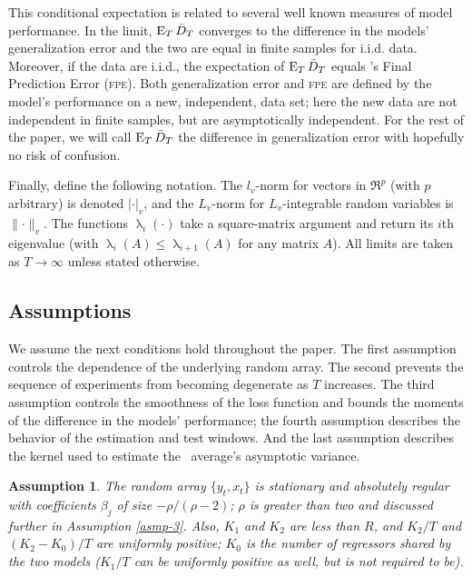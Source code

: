 \documentclass[11pt]{article}
\DeclareMathOperator{\eigen}{\lambda}
\newtheorem{asmp}{Assumption}
\newcommand{\citepos}[1]{\citeauthor{#1}'s \citeyearpar{#1}}
\begin{document}
This conditional expectation is related to several well known measures
of model performance.  In the limit, $\operatorname{E}_{T} \bar{D}_{T}$ converges to
the difference in the models' generalization error and the two are
equal in finite samples for i.i.d. data.  Moreover, if the data are
i.i.d., the expectation of $\operatorname{E}_T \bar{D}_{T}$ equals \citepos{Aka:69} Final
Prediction Error (\textsc{fpe}).  Both generalization error and
\textsc{fpe} are defined by the model's performance on a new,
independent, data set; here the new data are not independent in finite
samples, but are asymptotically independent.  For the rest of the
paper, we will call $\operatorname{E}_T \bar{D}_{T}$ the difference in generalization
error with hopefully no risk of confusion.

Finally, define the following notation.  The $l_v$-norm for vectors in
$\Re^p$ (with $p$ arbitrary) is denoted $\lvert \cdot \rvert_v$, and
the $L_v$-norm for $L_v$-integrable random variables is $\lVert \cdot
\rVert_v$.  The functions $\eigen_i(\cdot)$ take a square-matrix
argument and return its $i$th eigenvalue (with $\eigen_{i}(A) \leq
\eigen_{i+1}(A)$ for any matrix $A$).  All limits are taken as $T \to
\infty$ unless stated otherwise.
 
\subsection{Assumptions}

We assume the next conditions hold throughout the paper.  The first
assumption controls the dependence of the underlying random array.
The second prevents the sequence of experiments from becoming
degenerate as $T$ increases.  The third assumption controls the
smoothness of the loss function and bounds the moments of the
difference in the models' performance; the fourth assumption describes
the behavior of the estimation and test windows.  And the last
assumption describes the kernel used to estimate the \oos\ average's
asymptotic variance.

\begin{asmp}\label{asmp-1} 
  The random array $\{y_t,x_t\}$ is stationary and absolutely regular
  with coefficients $\beta_j$ of size $-\rho/(\rho-2)$; $\rho$ is
  greater than two and discussed further in Assumption \ref{asmp-3}.
  Also, $K_1$ and $K_2$ are less than $R$, and $K_2/T$ and
  $(K_2-K_0)/T$ are uniformly positive; $K_0$ is the number of
  regressors shared by the two models ($K_1/T$ can be uniformly
  positive as well, but is not required to be).
\end{asmp}
\end{document}

